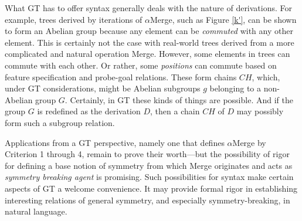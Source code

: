 \documentclass[11pt,twoside]{article}
\begin{document}
What GT has to offer syntax generally deals with the nature of derivations. For example, trees derived by iterations of $\alpha$Merge, such as Figure \ref{k'}, can be shown to form an Abelian group because any element can be \textsl{commuted} with any other element. This is certainly not the case with real-world trees derived from a more complicated and natural operation Merge. However, some elements in trees can commute with each other. Or rather, some \textsl{positions} can commute based on feature specification and probe-goal relations. These form chains $CH$, which, under GT considerations, might be Abelian subgroups $g$ belonging to a non-Abelian group $G$. Certainly, in GT these kinds of things are possible. And if the group $G$ is redefined as the derivation $D$, then a chain $CH$ of $D$ may possibly form such a subgroup relation.

Applications from a GT perspective, namely one that defines $\alpha$Merge by Criterion 1 through 4, remain to prove their worth---but the possibility of rigor for defining a base notion of symmetry from which Merge originates and acts as \textsl{symmetry breaking agent} is promising. Such possibilities for syntax make certain aspects of GT a welcome convenience. It may provide formal rigor in establishing interesting relations of general symmetry, and especially symmetry-breaking, in natural language.

\end{document}
